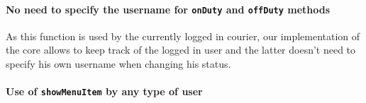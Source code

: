 \paragraph{No need to specify the username for \texttt{onDuty}
and \texttt{offDuty} methods} %
\label{par:no_need_to_specify_the_username_for_lstinline_onduty_and_lstinline_offduty_methods}
As this function is used by the currently logged in courier,
our implementation of the core allows to keep track of the logged in user
and the latter doesn't need to specify his own username when changing his status.

\paragraph{Use of \texttt{showMenuItem} by any type of user} %
\label{par:use_of_lstinline_showmenuitem_by_any_type_of_user}


